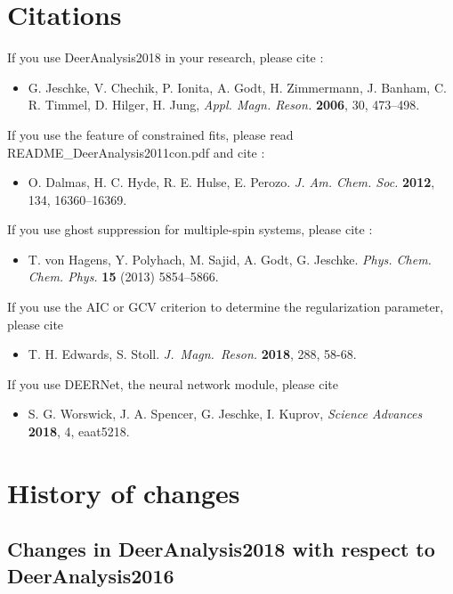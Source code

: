 \documentclass{article}
\begin{document}
\section{Citations}

If you use DeerAnalysis2018 in your research, please cite \cite{jeschke2006}:
\begin{itemize}
\item G. Jeschke, V. Chechik, P. Ionita, A. Godt, H. Zimmermann, J. Banham, C. R. Timmel, D. Hilger, H. Jung, \emph{Appl. Magn. Reson.} {\bf 2006}, 30, 473--498.
\end{itemize}

If you use the feature of constrained fits, please read {\ttfamily README\_DeerAnalysis2011con.pdf} and cite \cite{dalmas2012}:
\begin{itemize}
 \item O. Dalmas, H. C. Hyde, R. E. Hulse, E. Perozo. \emph{J. Am. Chem. Soc.} {\bf 2012}, 134, 16360--16369.
\end{itemize}

If you use ghost suppression for multiple-spin systems, please cite \cite{vonHagens2013}:
\begin{itemize}
\item T. von Hagens, Y. Polyhach, M. Sajid, A. Godt, G. Jeschke.
{\em Phys. Chem. Chem. Phys.} {\bf 15} (2013) 5854--5866.
\end{itemize}

If you use the AIC or GCV criterion to determine the regularization parameter, please cite \cite{edwards2018}
\begin{itemize}
\item
T. H. Edwards, S. Stoll.
\emph{J.~Magn.~Reson.} {\bf 2018}, 288, 58-68.
\end{itemize}

If you use DEERNet, the neural network module, please cite \cite{worswick2018}
\begin{itemize}
\item
S. G. Worswick, J. A. Spencer, G. Jeschke, I. Kuprov,
\emph{Science Advances} {\bf 2018}, 4, eaat5218.
\end{itemize}

\section{History of changes}
\subsection{Changes in DeerAnalysis2018 with respect to DeerAnalysis2016}
\label{changes_2018}
\end{document}
